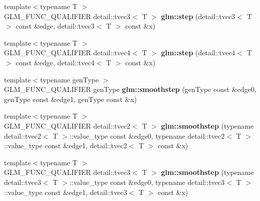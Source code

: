 \begin{DoxyCompactItemize}
\item 
\hypertarget{namespaceglm_afc1e0844aecc410c1ab7204423ea81f3}{{\footnotesize template$<$typename T $>$ }\\\-G\-L\-M\-\_\-\-F\-U\-N\-C\-\_\-\-Q\-U\-A\-L\-I\-F\-I\-E\-R \*
detail\-::tvec3$<$ \-T $>$ {\bfseries glm\-::step} (detail\-::tvec3$<$ \-T $>$ const \&edge, detail\-::tvec3$<$ \-T $>$ const \&x)}\label{namespaceglm_afc1e0844aecc410c1ab7204423ea81f3}

\item 
\hypertarget{namespaceglm_a473ace2b49062e6f5a5203697a7d369d}{{\footnotesize template$<$typename T $>$ }\\\-G\-L\-M\-\_\-\-F\-U\-N\-C\-\_\-\-Q\-U\-A\-L\-I\-F\-I\-E\-R \*
detail\-::tvec4$<$ \-T $>$ {\bfseries glm\-::step} (detail\-::tvec4$<$ \-T $>$ const \&edge, detail\-::tvec4$<$ \-T $>$ const \&x)}\label{namespaceglm_a473ace2b49062e6f5a5203697a7d369d}

\item 
\hypertarget{namespaceglm_aa7affcaa472f9cc58d8b2bbdd9e7d259}{{\footnotesize template$<$typename gen\-Type $>$ }\\\-G\-L\-M\-\_\-\-F\-U\-N\-C\-\_\-\-Q\-U\-A\-L\-I\-F\-I\-E\-R gen\-Type {\bfseries glm\-::smoothstep} (gen\-Type const \&edge0, gen\-Type const \&edge1, gen\-Type const \&x)}\label{namespaceglm_aa7affcaa472f9cc58d8b2bbdd9e7d259}

\item 
\hypertarget{namespaceglm_a014f47bc1de6cd13bf15da2f52ca298b}{{\footnotesize template$<$typename T $>$ }\\\-G\-L\-M\-\_\-\-F\-U\-N\-C\-\_\-\-Q\-U\-A\-L\-I\-F\-I\-E\-R \*
detail\-::tvec2$<$ \-T $>$ {\bfseries glm\-::smoothstep} (typename detail\-::tvec2$<$ \-T $>$\-::value\-\_\-type const \&edge0, typename detail\-::tvec2$<$ \-T $>$\-::value\-\_\-type const \&edge1, detail\-::tvec2$<$ \-T $>$ const \&x)}\label{namespaceglm_a014f47bc1de6cd13bf15da2f52ca298b}

\item 
\hypertarget{namespaceglm_ad4f7ebb9a2c7c0980deb0580f951ea75}{{\footnotesize template$<$typename T $>$ }\\\-G\-L\-M\-\_\-\-F\-U\-N\-C\-\_\-\-Q\-U\-A\-L\-I\-F\-I\-E\-R \*
detail\-::tvec3$<$ \-T $>$ {\bfseries glm\-::smoothstep} (typename detail\-::tvec3$<$ \-T $>$\-::value\-\_\-type const \&edge0, typename detail\-::tvec3$<$ \-T $>$\-::value\-\_\-type const \&edge1, detail\-::tvec3$<$ \-T $>$ const \&x)}\label{namespaceglm_ad4f7ebb9a2c7c0980deb0580f951ea75}


\end{DoxyCompactItemize}
